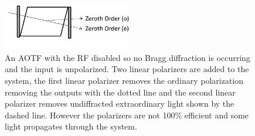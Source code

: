 \documentclass[12pt]{article}
\begin{document}
\begin{figure}
    \begin{center}
    \includegraphics[width=0.5\textwidth]{./Images/3-1-AOTFWithPolarizersNoRF.pdf}
    \caption{An AOTF with the RF disabled so no Bragg diffraction is occurring and the input is unpolarized. Two linear polarizers are added to the system, the first linear polarizer removes the ordinary polarization removing the outputs with the dotted line and the second linear polarizer removes undiffracted extraordinary light shown by the dashed line. However the polarizers are not 100\% efficient and some light propagates through the system.}
    \label{fig:3.1:ATOFLayoutWithPolarizersNoRF}
    \end{center}
\end{figure}

\clearpage
\end{document}
